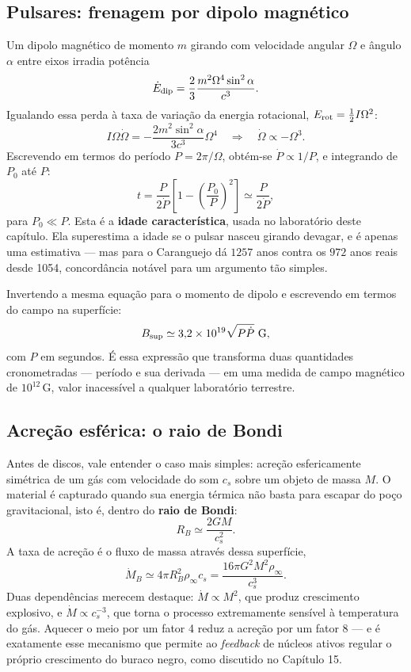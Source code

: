 \documentclass[11pt,a4paper]{article}
\begin{document}
\subsection*{Pulsares: frenagem por dipolo magnético}

Um dipolo magnético de momento $m$ girando com velocidade angular $\Omega$ e ângulo $\alpha$ entre eixos irradia potência
\[
\dot{E}_{\rm dip}=\frac{2}{3}\frac{m^{2}\Omega^{4}\sin^{2}\alpha}{c^{3}}.
\]
Igualando essa perda à taxa de variação da energia rotacional, $E_{\rm rot}=\frac{1}{2}I\Omega^{2}$:
\[
I\Omega\dot{\Omega}=-\frac{2m^{2}\sin^{2}\alpha}{3c^{3}}\Omega^{4}
\quad\Longrightarrow\quad
\dot{\Omega}\propto-\Omega^{3}.
\]
Escrevendo em termos do período $P=2\pi/\Omega$, obtém-se $\dot{P}\propto1/P$, e integrando de $P_0$ até $P$:
\[
t=\frac{P}{2\dot{P}}\left[1-\left(\frac{P_0}{P}\right)^{2}\right]\simeq\frac{P}{2\dot{P}},
\]
para $P_0\ll P$. Esta é a \textbf{idade característica}, usada no laboratório deste capítulo. Ela superestima a idade se o pulsar nasceu girando devagar, e é apenas uma estimativa --- mas para o Caranguejo dá $1257$ anos contra os $972$ anos reais desde 1054, concordância notável para um argumento tão simples.

Invertendo a mesma equação para o momento de dipolo e escrevendo em termos do campo na superfície:
\[
B_{\rm sup}\simeq3{,}2\times10^{19}\sqrt{P\dot{P}}\ \mathrm{G},
\]
com $P$ em segundos. É essa expressão que transforma duas quantidades cronometradas --- período e sua derivada --- em uma medida de campo magnético de $10^{12}\,\mathrm{G}$, valor inacessível a qualquer laboratório terrestre.

\subsection*{Acreção esférica: o raio de Bondi}

Antes de discos, vale entender o caso mais simples: acreção esfericamente simétrica de um gás com velocidade do som $c_s$ sobre um objeto de massa $M$. O material é capturado quando sua energia térmica não basta para escapar do poço gravitacional, isto é, dentro do \textbf{raio de Bondi}:
\[
R_B\simeq\frac{2GM}{c_s^{2}}.
\]
A taxa de acreção é o fluxo de massa através dessa superfície,
\[
\dot{M}_B\simeq4\pi R_B^{2}\rho_\infty c_s=\frac{16\pi G^{2}M^{2}\rho_\infty}{c_s^{3}}.
\]
Duas dependências merecem destaque: $\dot{M}\propto M^{2}$, que produz crescimento explosivo, e $\dot{M}\propto c_s^{-3}$, que torna o processo extremamente sensível à temperatura do gás. Aquecer o meio por um fator 4 reduz a acreção por um fator 8 --- e é exatamente esse mecanismo que permite ao \textit{feedback} de núcleos ativos regular o próprio crescimento do buraco negro, como discutido no Capítulo 15.
\end{document}

